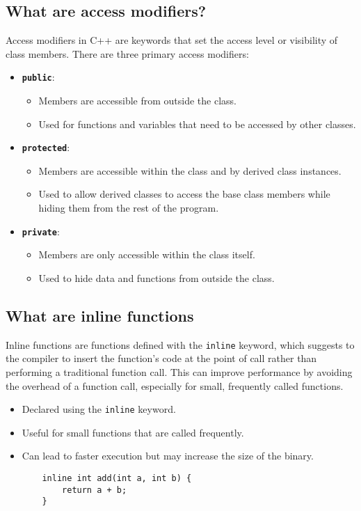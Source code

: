 \subsection{What are access modifiers?}
Access modifiers in C++ are keywords that set the access level or visibility of class members. There are three primary access modifiers:

\begin{itemize}
    \item \textbf{\texttt{public}}:
    \begin{itemize}
        \item Members are accessible from outside the class.
        \item Used for functions and variables that need to be accessed by other classes.
    \end{itemize}
    \item \textbf{\texttt{protected}}:
    \begin{itemize}
        \item Members are accessible within the class and by derived class instances.
        \item Used to allow derived classes to access the base class members while hiding them from the rest of the program.
    \end{itemize}
    \item \textbf{\texttt{private}}:
    \begin{itemize}
        \item Members are only accessible within the class itself.
        \item Used to hide data and functions from outside the class.
    \end{itemize}
\end{itemize}

\subsection{What are inline functions}
Inline functions are functions defined with the \texttt{inline} keyword, which suggests to the compiler to insert the function's code at the point of call rather than performing a traditional function call. This can improve performance by avoiding the overhead of a function call, especially for small, frequently called functions.

\begin{itemize}
    \item Declared using the \texttt{inline} keyword.
    \item Useful for small functions that are called frequently.
    \item Can lead to faster execution but may increase the size of the binary.
    \begin{tcolorbox}[title=Inline Function]
    \begin{verbatim}
    inline int add(int a, int b) {
        return a + b;
    }
    \end{verbatim}
    \end{tcolorbox}
\end{itemize}

